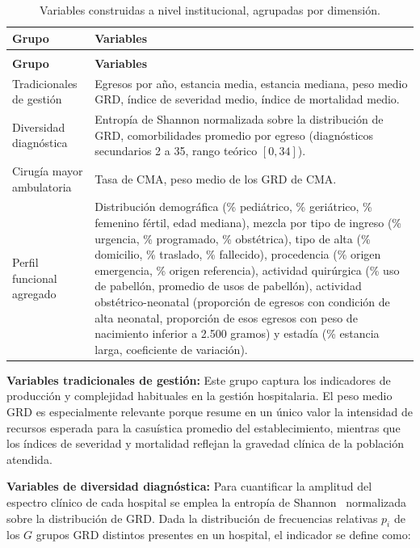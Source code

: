 {
\setlength{\LTleft}{0pt}
\setlength{\LTright}{\fill}
\begin{longtable}{>{\raggedright\arraybackslash}p{3.2cm} >{\raggedright\arraybackslash}p{8.5cm}}
\caption{Variables construidas a nivel institucional, agrupadas por dimensión.}
\label{tab:variables} \\
\toprule
\textbf{Grupo} & \textbf{Variables} \\
\midrule
\endfirsthead
\multicolumn{2}{l}{\textit{Tabla~\thetable\ (continuación)}} \\
\toprule
\textbf{Grupo} & \textbf{Variables} \\
\midrule
\endhead
\bottomrule
\endfoot
\raggedright Tradicionales de gestión &
Egresos por año, estancia media, estancia mediana, peso medio GRD, índice de
severidad medio, índice de mortalidad medio. \\
\addlinespace
\raggedright Diversidad diagnóstica &
Entropía de Shannon normalizada sobre la distribución de GRD, comorbilidades
promedio por egreso (diagnósticos secundarios 2 a 35, rango teórico $[0,34]$). \\
\addlinespace
\raggedright Cirugía mayor ambulatoria &
Tasa de CMA, peso medio de los GRD de CMA. \\
\addlinespace
\raggedright Perfil funcional agregado &
Distribución demográfica (\% pediátrico, \% geriátrico, \% femenino fértil, edad
mediana), mezcla por tipo de ingreso (\% urgencia, \% programado, \% obstétrica),
tipo de alta (\% domicilio, \% traslado, \% fallecido), procedencia (\% origen
emergencia, \% origen referencia), actividad quirúrgica (\% uso de pabellón,
promedio de usos de pabellón), actividad obstétrico-neonatal (proporción de
egresos con condición de alta neonatal, proporción de esos egresos con peso de
nacimiento inferior a 2.500 gramos) y estadía (\% estancia larga, coeficiente de
variación). \\
\bottomrule
\end{longtable}
}

\textbf{Variables tradicionales de gestión:} Este grupo captura los indicadores de producción y complejidad habituales en la
gestión hospitalaria. El peso medio GRD es especialmente relevante porque resume
en un único valor la intensidad de recursos esperada para la casuística promedio
del establecimiento, mientras que los índices de severidad y mortalidad reflejan
la gravedad clínica de la población atendida.

\textbf{Variables de diversidad diagnóstica:} Para cuantificar la amplitud del espectro clínico de cada hospital se emplea la
entropía de Shannon~\citep{Shannon1948} normalizada sobre la distribución de GRD. Dada la
distribución de frecuencias relativas $p_i$ de los $G$ grupos GRD distintos
presentes en un hospital, el indicador se define como:

